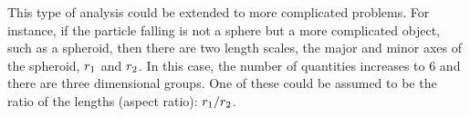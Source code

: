 \begin{solution}
This type of analysis could be extended to more complicated problems. For instance, if the particle falling is not a sphere but a more complicated object, such as a spheroid, then there are two length scales, the major and minor axes of the spheroid, $r_1$ and $r_2$. In this case, the number of quantities increases to 6 and there are three dimensional groups. One of these could be assumed to be the ratio of the lengths (aspect ratio): $r_1/r_2$.
\end{solution}
